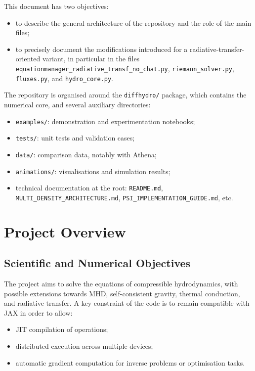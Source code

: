 \documentclass[a4paper, 11pt]{article}
\begin{document}
This document has two objectives:
\begin{itemize}
    \item to describe the general architecture of the repository and the role of the main files;
    \item to precisely document the modifications introduced for a radiative-transfer-oriented variant, in particular in the files \texttt{equationmanager\_radiative\_transf\_no\_chat.py}, \texttt{riemann\_solver.py}, \texttt{fluxes.py}, and \texttt{hydro\_core.py}.
\end{itemize}

The repository is organised around the \texttt{diffhydro/} package, which contains the numerical core, and several auxiliary directories:
\begin{itemize}
    \item \texttt{examples/}: demonstration and experimentation notebooks;
    \item \texttt{tests/}: unit tests and validation cases;
    \item \texttt{data/}: comparison data, notably with Athena;
    \item \texttt{animations/}: visualisations and simulation results;
    \item technical documentation at the root: \texttt{README.md}, \texttt{MULTI\_DENSITY\_ARCHITECTURE.md}, \texttt{PSI\_IMPLEMENTATION\_GUIDE.md}, etc.
\end{itemize}

\section{Project Overview}

\subsection{Scientific and Numerical Objectives}
The project aims to solve the equations of compressible hydrodynamics, with possible extensions towards MHD, self-consistent gravity, thermal conduction, and radiative transfer. A key constraint of the code is to remain compatible with JAX in order to allow:
\begin{itemize}
    \item JIT compilation of operations;
    \item distributed execution across multiple devices;
    \item automatic gradient computation for inverse problems or optimisation tasks.
\end{itemize}
\end{document}
